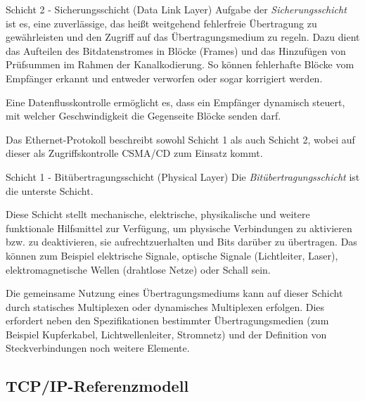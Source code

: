 \begin{defi}{Schicht 2 - Sicherungsschicht (Data Link Layer)}
    Aufgabe der \emph{Sicherungsschicht} ist es, eine zuverlässige, das heißt weitgehend fehlerfreie Übertragung zu gewährleisten und den Zugriff auf das Übertragungsmedium zu regeln. Dazu dient das Aufteilen des Bitdatenstromes in Blöcke (Frames) und das Hinzufügen von Prüfsummen im Rahmen der Kanalkodierung.
    So können fehlerhafte Blöcke vom Empfänger erkannt und entweder verworfen oder sogar korrigiert werden.

    Eine Datenflusskontrolle ermöglicht es, dass ein Empfänger dynamisch steuert, mit welcher Geschwindigkeit die Gegenseite Blöcke senden darf.

    Das Ethernet-Protokoll beschreibt sowohl Schicht 1 als auch Schicht 2, wobei auf dieser als Zugriffskontrolle CSMA/CD zum Einsatz kommt.
\end{defi}

\begin{defi}{Schicht 1 - Bitübertragungsschicht (Physical Layer)}
    Die \emph{Bitübertragungsschicht} ist die unterste Schicht.

    Diese Schicht stellt mechanische, elektrische, physikalische und weitere funktionale Hilfsmittel zur Verfügung, um physische Verbindungen zu aktivieren bzw. zu deaktivieren, sie aufrechtzuerhalten und Bits darüber zu übertragen. Das können zum Beispiel elektrische Signale, optische Signale (Lichtleiter, Laser), elektromagnetische Wellen (drahtlose Netze) oder Schall sein.

    Die gemeinsame Nutzung eines Übertragungsmediums kann auf dieser Schicht durch statisches Multiplexen oder dynamisches Multiplexen erfolgen. Dies erfordert neben den Spezifikationen bestimmter Übertragungsmedien (zum Beispiel Kupferkabel, Lichtwellenleiter, Stromnetz) und der Definition von Steckverbindungen noch weitere Elemente.
\end{defi}

\subsection{TCP/IP-Referenzmodell}

